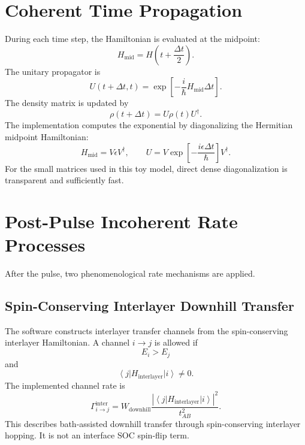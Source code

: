 \documentclass[11pt,a4paper]{article}
\newcommand{\ket}[1]{\left|#1\right\rangle}
\newcommand{\bra}[1]{\left\langle #1\right|}
\begin{document}
\section{Coherent Time Propagation}

During each time step, the Hamiltonian is evaluated at the midpoint:
\begin{equation}
H_{\mathrm{mid}}=H\left(t+\frac{\Delta t}{2}\right).
\end{equation}
The unitary propagator is
\begin{equation}
U(t+\Delta t,t)
=
\exp\left[-\frac{i}{\hbar}H_{\mathrm{mid}}\Delta t\right].
\end{equation}
The density matrix is updated by
\begin{equation}
\rho(t+\Delta t)=U\rho(t)U^\dagger.
\end{equation}
The implementation computes the exponential by diagonalizing the Hermitian midpoint Hamiltonian:
\begin{equation}
H_{\mathrm{mid}}=V\epsilon V^\dagger,
\qquad
U=V\exp\left[-\frac{i\epsilon\Delta t}{\hbar}\right]V^\dagger.
\end{equation}
For the small matrices used in this toy model, direct dense diagonalization is transparent and sufficiently fast.

\section{Post-Pulse Incoherent Rate Processes}

After the pulse, two phenomenological rate mechanisms are applied.

\subsection{Spin-Conserving Interlayer Downhill Transfer}

The software constructs interlayer transfer channels from the spin-conserving interlayer Hamiltonian.  A channel $i\rightarrow j$ is allowed if
\begin{equation}
E_i>E_j
\end{equation}
and
\begin{equation}
\bra{j}H_{\mathrm{interlayer}}\ket{i}\neq 0.
\end{equation}
The implemented channel rate is
\begin{equation}
\Gamma_{i\rightarrow j}^{\mathrm{inter}}
=
W_{\mathrm{downhill}}
\frac{|\bra{j}H_{\mathrm{interlayer}}\ket{i}|^2}{t_{AB}^2}.
\end{equation}
This describes bath-assisted downhill transfer through spin-conserving interlayer hopping.  It is not an interface SOC spin-flip term.
\end{document}

